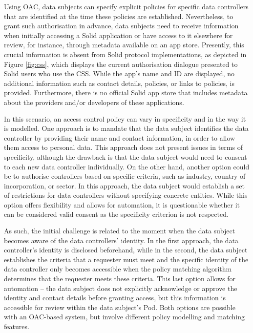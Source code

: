 Using OAC, data subjects can specify explicit policies for specific data controllers that are identified at the time these policies are established. 
Nevertheless, to grant such authorisation in advance, data subjects need to receive information when initially accessing a Solid application or have access to it elsewhere for review, for instance, through metadata available on an app store.
Presently, this crucial information is absent from Solid protocol implementations, as depicted in Figure \ref{fig:css}, which displays the current authorisation dialogue presented to Solid users who use the CSS. 
While the app's name and ID are displayed, no additional information such as contact details, policies, or links to policies, is provided.
Furthermore, there is no official Solid app store that includes metadata about the providers and/or developers of these applications.

In this scenario, an access control policy can vary in specificity and in the way it is modelled.
One approach is to mandate that the data subject identifies the data controller by providing their name and contact information, in order to allow them access to personal data.
This approach does not present issues in terms of specificity, although the drawback is that the data subject would need to consent to each new data controller individually.
On the other hand, another option could be to authorise controllers based on specific criteria, such as industry, country of incorporation, or sector.
In this approach, the data subject would establish a set of restrictions for data controllers without specifying concrete entities.
While this option offers flexibility and allows for automation, it is questionable whether it can be considered valid consent as the specificity criterion is not respected.

As such, the initial challenge is related to the moment when the data subject becomes aware of the data controllers' identity.
In the first approach, the data controller's identity is disclosed beforehand, while in the second, the data subject establishes the criteria that a requester must meet and the specific identity of the data controller only becomes accessible when the policy matching algorithm determines that the requester meets these criteria.
This last option allows for automation -- the data subject does not explicitly acknowledge or approve the identity and contact details before granting access, but this information is accessible for review within the data subject's Pod.
Both options are possible with an OAC-based system, but involve different policy modelling and matching features.

